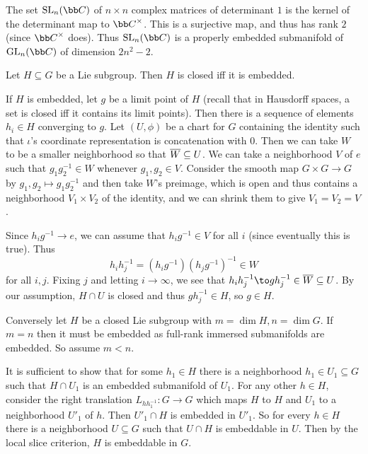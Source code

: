\eexam

\bexam

    The set $\Sl_n(\bC)$ of $n\times n$ complex matrices of determinant $1$ is the kernel of the determinant map to $\bC^\times$.
    This is a surjective map, and thus has rank $2$ (since $\bC^\times$ does).
    Thus $\Sl_n(\bC)$ is a properly embedded submanifold of $\gl_n(\bC)$ of dimension $2n^2-2$.

\eexam

\bthrm

    Let $H\subseteq G$ be a Lie subgroup.
    Then $H$ is closed iff it is embedded.

\ethrm

\bproof

    If $H$ is embedded, let $g$ be a limit point of $H$ (recall that in Hausdorff spaces, a set is closed iff it contains its limit points).
    Then there is a sequence of elements $h_i\in H$ converging to $g$.
    Let $(U,\phi)$ be a chart for $G$ containing the identity such that $\iota$'s coordinate representation is concatenation with $0$.
    Then we can take $W$ to be a smaller neighborhood so that $\overline W\subseteq U$.
    We can take a neighborhood $V$ of $e$ such that $g_1g_2^{-1}\in W$ whenever $g_1,g_2\in V$.
    Consider the smooth map $G\times G\to G$ by $g_1,g_2\mapsto g_1g_2^{-1}$ and then take $W$'s preimage, which is open and thus contains
    a neighborhood $V_1\times V_2$ of the identity, and we can shrink them to give $V_1=V_2=V$.

    Since $h_ig^{-1}\to e$, we can assume that $h_ig^{-1}\in V$ for all $i$ (since eventually this is true).
    Thus
    $$ h_ih_j^{-1} = (h_ig^{-1})(h_jg^{-1})^{-1} \in W $$
    for all $i,j$.
    Fixing $j$ and letting $i\to\infty$, we see that $h_ih_j^{-1}\to gh_j^{-1}\in\cl W\subseteq U$.
    By our assumption, $H\cap U$ is closed and thus $gh_j^{-1}\in H$, so $g\in H$.

    Conversely let $H$ be a closed Lie subgroup with $m=\dim H,n=\dim G$.
    If $m=n$ then it must be embedded as full-rank immersed submanifolds are embedded.
    So assume $m<n$.

    It is sufficient to show that for some $h_1\in H$ there is a neighborhood $h_1\in U_1\subseteq G$ such that $H\cap U_1$ is an embedded submanifold
    of $U_1$.
    For any other $h\in H$, consider the right translation $L_{hh_1^{-1}}\colon G\to G$ which maps $H$ to $H$ and $U_1$ to a neighborhood
    $U'_1$ of $h$.
    Then $U'_1\cap H$ is embedded in $U'_1$.
    So for every $h\in H$ there is a neighborhood $U\subseteq G$ such that $U\cap H$ is embeddable in $U$.
    Then by the local slice criterion, $H$ is embeddable in $G$.


